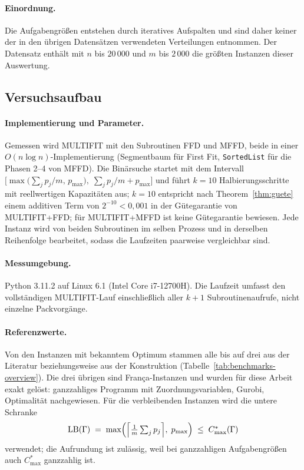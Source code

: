 \paragraph{Einordnung.}
Die Aufgabengrößen entstehen durch iteratives Aufspalten und sind daher keiner der in den
übrigen Datensätzen verwendeten Verteilungen entnommen.
Der Datensatz enthält mit $n$ bis $20\,000$ und $m$ bis $2\,000$ die größten Instanzen
dieser Auswertung.

\subsection{Versuchsaufbau}
\label{sec:versuchsaufbau}

\paragraph{Implementierung und Parameter.}
Gemessen wird MULTIFIT mit den Subroutinen FFD und MFFD, beide in einer
$O(n \log n)$-Implementierung (Segmentbaum für First Fit, \texttt{SortedList} für die
Phasen 2--4 von MFFD).
Die Binärsuche startet mit dem Intervall
$\bigl[\max\bigl(\sum_j p_j/m,\, p_{\max}\bigr),\; \sum_j p_j/m + p_{\max}\bigr]$
und führt $k = 10$ Halbierungsschritte mit reellwertigen Kapazitäten aus;
$k = 10$ entspricht nach Theorem~\ref{thm:guete} einem additiven Term von $2^{-10} < 0{,}001$
in der Gütegarantie von MULTIFIT+FFD; für MULTIFIT+MFFD ist keine Gütegarantie bewiesen.
Jede Instanz wird von beiden Subroutinen im selben Prozess und in derselben Reihenfolge
bearbeitet, sodass die Laufzeiten paarweise vergleichbar sind.

\paragraph{Messumgebung.}
Python 3.11.2 auf Linux 6.1 (Intel Core i7-12700H).
Die Laufzeit umfasst den vollständigen MULTIFIT-Lauf einschließlich aller
$k+1$ Subroutinenaufrufe, nicht einzelne Packvorgänge.

\paragraph{Referenzwerte.}
Von den \EvalOptBekannt{} Instanzen mit bekanntem Optimum stammen alle bis auf drei aus der
Literatur beziehungsweise aus der Konstruktion (Tabelle~\ref{tab:benchmarks-overview}).
Die drei übrigen sind França-Instanzen und wurden für diese Arbeit exakt gelöst: ganzzahliges
Programm mit Zuordnungsvariablen, Gurobi, Optimalität nachgewiesen.
Für die verbleibenden \EvalOhneOpt{} Instanzen wird die untere Schranke
\begin{equation}
  \mathrm{LB}(\Gamma) \;=\; \max\Bigl(\Bigl\lceil \tfrac{1}{m}\textstyle\sum_j p_j \Bigr\rceil,\; p_{\max}\Bigr)
  \;\le\; C^{*}_{\max}(\Gamma)
  \label{eq:lb}
\end{equation}
verwendet; die Aufrundung ist zulässig, weil bei ganzzahligen Aufgabengrößen auch $C^{*}_{\max}$
ganzzahlig ist.

